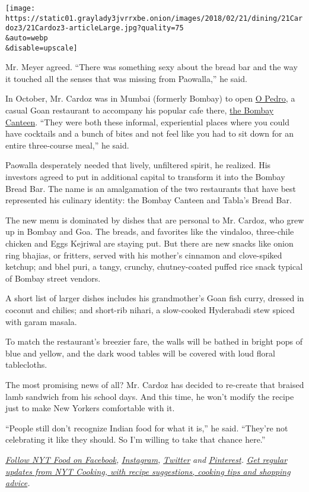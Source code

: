\texttt{[image: https://static01.graylady3jvrrxbe.onion/images/2018/02/21/dining/21Cardoz3/21Cardoz3-articleLarge.jpg?quality=75\\\&auto=webp\\\&disable=upscale]}

Mr. Meyer agreed. ``There was something sexy about the bread bar and the
way it touched all the senses that was missing from Paowalla,'' he said.

In October, Mr. Cardoz was in Mumbai (formerly Bombay) to open
\href{http://opedromumbai.com/}{O Pedro}, a casual Goan restaurant to
accompany his popular cafe there,
\href{http://thebombaycanteen.com/}{the Bombay Canteen}. ``They were
both these informal, experiential places where you could have cocktails
and a bunch of bites and not feel like you had to sit down for an entire
three-course meal,'' he said.

Paowalla desperately needed that lively, unfiltered spirit, he realized.
His investors agreed to put in additional capital to transform it into
the Bombay Bread Bar. The name is an amalgamation of the two restaurants
that have best represented his culinary identity: the Bombay Canteen and
Tabla's Bread Bar.

The new menu is dominated by dishes that are personal to Mr. Cardoz, who
grew up in Bombay and Goa. The breads, and favorites like the vindaloo,
three-chile chicken and Eggs Kejriwal are staying put. But there are new
snacks like onion ring bhajias, or fritters, served with his mother's
cinnamon and clove-spiked ketchup; and bhel puri, a tangy, crunchy,
chutney-coated puffed rice snack typical of Bombay street vendors.

A short list of larger dishes includes his grandmother's Goan fish
curry, dressed in coconut and chilies; and short-rib nihari, a
slow-cooked Hyderabadi stew spiced with garam masala.

To match the restaurant's breezier fare, the walls will be bathed in
bright pops of blue and yellow, and the dark wood tables will be covered
with loud floral tablecloths.

The most promising news of all? Mr. Cardoz has decided to re-create that
braised lamb sandwich from his school days. And this time, he won't
modify the recipe just to make New Yorkers comfortable with it.

``People still don't recognize Indian food for what it is,'' he said.
``They're not celebrating it like they should. So I'm willing to take
that chance here.''

\href{https://www.facebookcorewwwi.onion/nytfood/}{\emph{Follow NYT Food
on Facebook}}\emph{,}
\href{https://instagram.com/nytfood}{\emph{Instagram}}\emph{,}
\href{https://twitter.com/nytfood}{\emph{Twitter}} \emph{and}
\href{https://www.pinterest.com/nytfood/}{\emph{Pinterest}}\emph{.}
\href{https://www.nytimes3xbfgragh.onion/newsletters/cooking}{\emph{Get
regular updates from NYT Cooking, with recipe suggestions, cooking tips
and shopping advice}}\emph{.}

